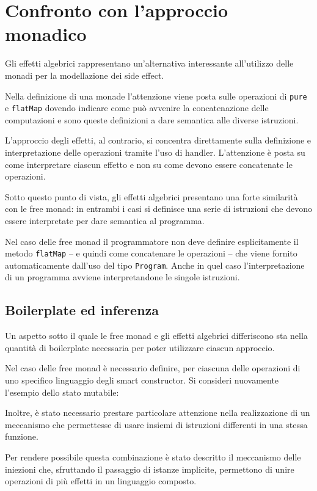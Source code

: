 \section{Confronto con l'approccio monadico}
Gli effetti algebrici rappresentano un'alternativa interessante all'utilizzo delle monadi per la modellazione dei side effect.

Nella definizione di una monade l'attenzione viene posta sulle operazioni di \lstinline{pure} e \lstinline{flatMap} dovendo indicare come può avvenire la concatenazione delle computazioni e sono queste definizioni a dare semantica alle diverse istruzioni.

L'approccio degli effetti, al contrario, si concentra direttamente sulla definizione e interpretazione delle operazioni tramite l'uso di handler. L'attenzione è posta su come interpretare ciascun effetto e non su come devono essere concatenate le operazioni.

Sotto questo punto di vista, gli effetti algebrici presentano una forte similarità con le free monad: in entrambi i casi si definisce una serie di istruzioni che devono essere interpretate per dare semantica al programma.

Nel caso delle free monad il programmatore non deve definire esplicitamente il metodo \lstinline{flatMap} -- e quindi come concatenare le operazioni -- che viene fornito automaticamente dall'uso del tipo \lstinline{Program}.
Anche in quel caso l'interpretazione di un programma avviene interpretandone le singole istruzioni.

\subsection{Boilerplate ed inferenza}
Un aspetto sotto il quale le free monad e gli effetti algebrici differiscono sta nella quantità di boilerplate necessaria per poter utilizzare ciascun approccio.

Nel caso delle free monad è necessario definire, per ciascuna delle operazioni di uno specifico linguaggio degli smart constructor. Si consideri nuovamente l'esempio dello stato mutabile:

Inoltre, è stato necessario prestare particolare attenzione nella realizzazione di un meccanismo che permettesse di usare insiemi di istruzioni differenti in una stessa funzione.

Per rendere possibile questa combinazione è stato descritto il meccanismo delle iniezioni che, sfruttando il passaggio di istanze implicite, permettono di unire operazioni di più effetti in un linguaggio composto.

